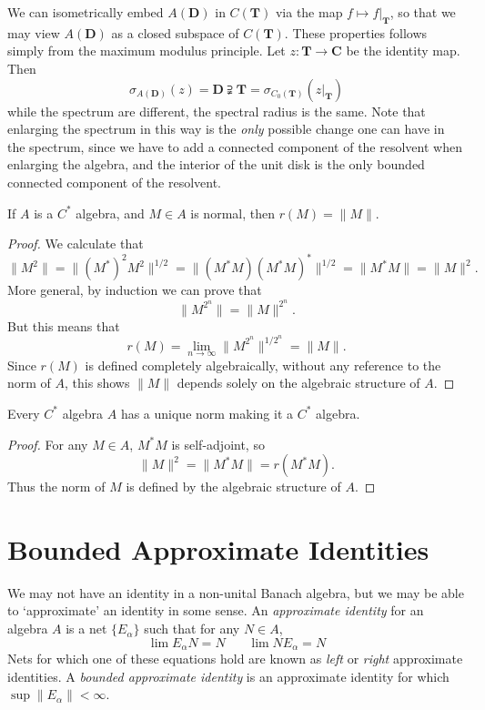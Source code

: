 \begin{example}
    We can isometrically embed $A(\mathbf{D})$ in $C(\mathbf{T})$ via the map $f \mapsto f|_\mathbf{T}$, so that we may view $A(\mathbf{D})$ as a closed subspace of $C(\mathbf{T})$. These properties follows simply from the maximum modulus principle. Let $z: \mathbf{T} \to \mathbf{C}$ be the identity map. Then
    \[ \sigma_{A(\mathbf{D})}(z) = \mathbf{D} \supsetneqq \mathbf{T} = \sigma_{C_0(\mathbf{T})}(z|_\mathbf{T}) \]
    while the spectrum are different, the spectral radius is the same. Note that enlarging the spectrum in this way is the \emph{only} possible change one can have in the spectrum, since we have to add a connected component of the resolvent when enlarging the algebra, and the interior of the unit disk is the only bounded connected component of the resolvent.
\end{example}

\begin{corollary}
    If $A$ is a $C^*$ algebra, and $M \in A$ is normal, then $r(M) = \| M \|$.
\end{corollary}
\begin{proof}
    We calculate that
    \[ \| M^2 \| = \| (M^*)^2 M^2 \|^{1/2} = \| (M^* M) (M^* M)^* \|^{1/2} = \| M^* M \| = \| M \|^2. \]
    More general, by induction we can prove that
    \[ \| M^{2^n} \| = \| M \|^{2^n}. \]
    But this means that
    \[ r(M) = \lim_{n \to \infty} \| M^{2^n} \|^{1/2^n} = \| M \|. \]
    Since $r(M)$ is defined completely algebraically, without any reference to the norm of $A$, this shows $\| M \|$ depends solely on the algebraic structure of $A$.
\end{proof}

\begin{corollary}
    Every $C^*$ algebra $A$ has a unique norm making it a $C^*$ algebra.
\end{corollary}
\begin{proof}
    For any $M \in A$, $M^* M$ is self-adjoint, so
    \[ \| M \|^2 = \| M^*M \| = r(M^*M). \]
    Thus the norm of $M$ is defined by the algebraic structure of $A$.
\end{proof}

\section{Bounded Approximate Identities}

We may not have an identity in a non-unital Banach algebra, but we may be able to `approximate' an identity in some sense. An \emph{approximate identity} for an algebra $A$ is a net $\{ E_\alpha \}$ such that for any $N \in A$,
%
\[ \lim E_\alpha N = N\ \ \ \ \ \ \ \ \lim N E_\alpha = N \]
%
Nets for which one of these equations hold are known as \emph{left} or \emph{right} approximate identities. A \emph{bounded approximate identity} is an approximate identity for which $\sup \| E_\alpha \| < \infty$.

